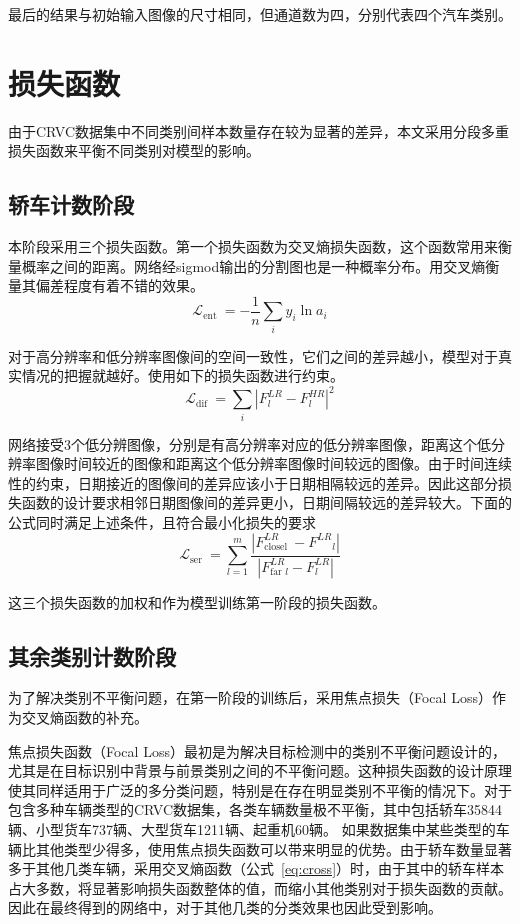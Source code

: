 最后的结果与初始输入图像的尺寸相同，但通道数为四，分别代表四个汽车类别。
\section{损失函数}
由于CRVC数据集中不同类别间样本数量存在较为显著的差异，本文采用分段多重损失函数来平衡不同类别对模型的影响。
\subsection{轿车计数阶段}
本阶段采用三个损失函数。第一个损失函数为交叉熵损失函数，这个函数常用来衡量概率之间的距离。网络经sigmod输出的分割图也是一种概率分布。用交叉熵衡量其偏差程度有着不错的效果。
\begin{equation}
    \mathcal{L}_{\text {ent }}=-\frac{1}{n} \sum_{i} y_{i} \ln a_{i}
    \label{eq:cross}
\end{equation}

对于高分辨率和低分辨率图像间的空间一致性，它们之间的差异越小，模型对于真实情况的把握就越好。使用如下的损失函数进行约束。
\begin{equation}
    \mathcal{L}_{\text {dif }}=\sum_{i}\left|F_l^{L R}-F^{HR}_{l}\right|^2
\end{equation}

网络接受3个低分辨图像，分别是有高分辨率对应的低分辨率图像，距离这个低分辨率图像时间较近的图像和距离这个低分辨率图像时间较远的图像。由于时间连续性的约束，日期接近的图像间的差异应该小于日期相隔较远的差异。因此这部分损失函数的设计要求相邻日期图像间的差异更小，日期间隔较远的差异较大。下面的公式同时满足上述条件，且符合最小化损失的要求
\begin{equation}
    \mathcal{L}_{\text {ser }}=\sum_{l=1}^{m} \frac{\left|F_{\text {closel }}^{L R}-F^{L R}{ }_{l}\right|}{\left|F_{\text {far } l}^{L R}-F^{L R}_ l\right|}
\end{equation}

这三个损失函数的加权和作为模型训练第一阶段的损失函数。


\subsection{其余类别计数阶段}
为了解决类别不平衡问题，在第一阶段的训练后，采用焦点损失（Focal Loss）作为交叉熵函数的补充。

焦点损失函数（Focal Loss）\cite{lin2017focal}最初是为解决目标检测中的类别不平衡问题设计的，尤其是在目标识别中背景与前景类别之间的不平衡问题。这种损失函数的设计原理使其同样适用于广泛的多分类问题，特别是在存在明显类别不平衡的情况下。对于包含多种车辆类型的CRVC数据集，各类车辆数量极不平衡，其中包括轿车35844辆、小型货车737辆、大型货车1211辆、起重机60辆。 如果数据集中某些类型的车辆比其他类型少得多，使用焦点损失函数可以带来明显的优势。由于轿车数量显著多于其他几类车辆，采用交叉熵函数（公式~\ref{eq:cross}）时，由于其中的轿车样本占大多数，将显著影响损失函数整体的值，而缩小其他类别对于损失函数的贡献。因此在最终得到的网络中，对于其他几类的分类效果也因此受到影响。


